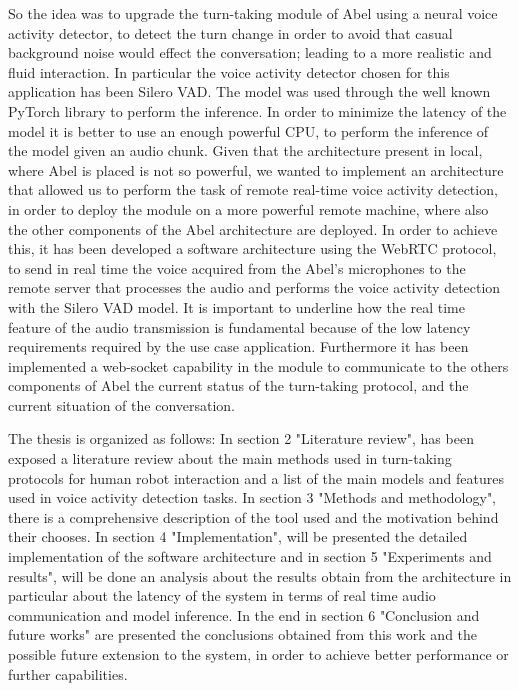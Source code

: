 \documentclass[../main.tex]{subfiles}
\begin{document}
So the idea was to upgrade the turn-taking module of Abel using a neural voice activity detector, to detect the turn change in order to avoid that casual background noise would effect the conversation; leading to a more realistic and fluid interaction. In particular the voice activity detector chosen for this application has been Silero VAD. The model was used through the well known PyTorch library to perform the inference. In order to minimize the latency of the model it is better to use an enough powerful CPU, to perform the inference of the model given an audio chunk. Given that the architecture present in local, where Abel is placed is not so powerful, we wanted to implement an architecture that allowed us to perform the task of remote real-time voice activity detection, in order to deploy the module on a more powerful remote machine, where also the other components of the Abel architecture are deployed. In order to achieve this, it has been developed a software architecture using the WebRTC protocol, to send in real time the voice acquired from the Abel's microphones to the remote server that processes the audio and performs the voice activity detection with the Silero VAD model. It is important to underline how the real time feature of the audio transmission is fundamental because of the low latency requirements required by the use case application. Furthermore it has been implemented a web-socket capability in the module to communicate to the others components of Abel the current status of the turn-taking protocol, and the current situation of the conversation.

The thesis is organized as follows:
In section 2 "Literature review", has been exposed a literature review about the main methods used in turn-taking protocols for human robot interaction and a list of the main models and features used in voice activity detection tasks. In section 3 "Methods and methodology", there is a comprehensive description of the tool used and the motivation behind their chooses. In section 4 "Implementation", will be presented the detailed implementation of the software architecture and in section 5 "Experiments and results", will be done an analysis about the results obtain from the architecture in particular about the latency of the system in terms of real time audio communication and model inference. In the end in section 6 "Conclusion and future works" are presented the conclusions obtained from this work and the possible future extension to the system, in order to achieve better performance or further capabilities.
\end{document}
